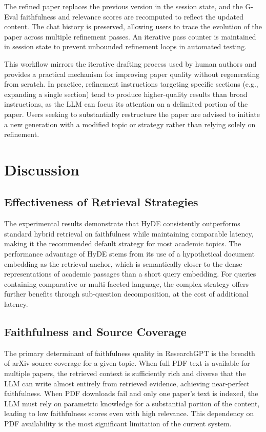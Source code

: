 \documentclass[12pt, a4paper]{article}
\begin{document}
The refined paper replaces the previous version in the session state, and the
G-Eval faithfulness and relevance scores are recomputed to reflect the updated
content. The chat history is preserved, allowing users to trace the evolution of
the paper across multiple refinement passes. An iterative pass counter is
maintained in session state to prevent unbounded refinement loops in automated
testing.

This workflow mirrors the iterative drafting process used by human authors and
provides a practical mechanism for improving paper quality without regenerating
from scratch. In practice, refinement instructions targeting specific sections
(e.g., expanding a single section) tend to produce higher-quality results than
broad instructions, as the LLM can focus its attention on a delimited portion of
the paper. Users seeking to substantially restructure the paper are advised to
initiate a new generation with a modified topic or strategy rather than relying
solely on refinement.

\section{Discussion}

\subsection{Effectiveness of Retrieval Strategies}

The experimental results demonstrate that HyDE consistently outperforms standard
hybrid retrieval on faithfulness while maintaining comparable latency, making it
the recommended default strategy for most academic topics. The performance advantage
of HyDE stems from its use of a hypothetical document embedding as the retrieval
anchor, which is semantically closer to the dense representations of academic
passages than a short query embedding. For queries containing comparative or
multi-faceted language, the complex strategy offers further benefits through
sub-question decomposition, at the cost of additional latency.

\subsection{Faithfulness and Source Coverage}

The primary determinant of faithfulness quality in ResearchGPT is the breadth of
arXiv source coverage for a given topic. When full PDF text is available for
multiple papers, the retrieved context is sufficiently rich and diverse that the
LLM can write almost entirely from retrieved evidence, achieving near-perfect
faithfulness. When PDF downloads fail and only one paper's text is indexed, the LLM
must rely on parametric knowledge for a substantial portion of the content, leading
to low faithfulness scores even with high relevance. This dependency on PDF
availability is the most significant limitation of the current system.
\end{document}

